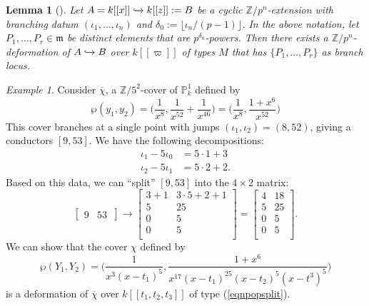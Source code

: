 \documentclass{compositio}
\newtheorem{lemma}[theorem]{Lemma}
\theoremstyle{remark}
\newtheorem{example}[theorem]{Example}
\theoremstyle{remark}
\begin{document}
\begin{lemma}[{\cite[Key Lemma 3.2]{MR3194816}}]
\label{lemmapopdeformation}
Let $A=k[[x]] \xhookrightarrow{} k[[z]]:=B $ be a cyclic $\mathbb{Z}/p^n$-extension with branching datum $(\iota_1, \ldots, \iota_n)$ and $\delta_0:=\lfloor \iota_n/(p-1) \rfloor$. In the above notation, let $P_1, \ldots, P_r \in \mathfrak{m}$ be distinct elements that are $p^{\delta_0}$-powers. Then there exists a $\mathbb{Z}/p^n$-deformation of $A \xhookrightarrow{} B$ over $k[[\varpi]]$ of types $M$ that has $\{P_1, \ldots, P_r\}$ as branch locus.
\end{lemma}



\begin{example}
\label{examplepopdeformation}
Consider $\overline{\chi}$, a $\mathbb{Z}/5^2$-cover of $\mathbb{P}^1_k$ defined by
\[ \wp(y_1,y_2)=\bigg( \frac{1}{x^8}, \frac{1}{x^{52}}+\frac{1}{x^{46}} \bigg)=\bigg( \frac{1}{x^8}, \frac{1+x^6}{x^{52}}\bigg) \]
This cover branches at a single point with jumps $(\iota_1, \iota_2)=(8, 52)$, giving a conductors $[9,53]$. We have the following decompositions:
\begin{equation}
\begin{split}
\iota_1-5\iota_0 & = 5 \cdot 1 + 3 \\
\iota_2-5\iota_1 & = 5 \cdot 2+2.
\end{split}
\end{equation}
Based on this data, we can ``split'' $[9,53]$ into the $4 \times 2$ matrix:
\begin{equation}
\label{eqnpopsplit}
\begin{bmatrix}
9 & 53 \
\end{bmatrix} \xrightarrow{} \begin{bmatrix}
3+1 & 3\cdot 5+2+1 \\
5 & 25 \\
0 & 5\\
0 & 5\\
\end{bmatrix}=\begin{bmatrix}
4 & 18 \\
5 & 25 \\
0 & 5\\
0 & 5 \\
\end{bmatrix}.
\end{equation}
We can show that the cover $\chi$ defined by
\[ \wp(Y_1,Y_2)= \bigg(\frac{1}{x^3(x-t_1)^5}, \frac{1+x^6}{x^{17}(x-t_1)^{25}(x-t_2)^{5}(x-t^3)^{5}}  \bigg) \]
is a deformation of $\overline{\chi}$ over $k[[t_1,t_2,t_3]]$ of type (\ref{eqnpopsplit}).
\end{example}
\end{document}
